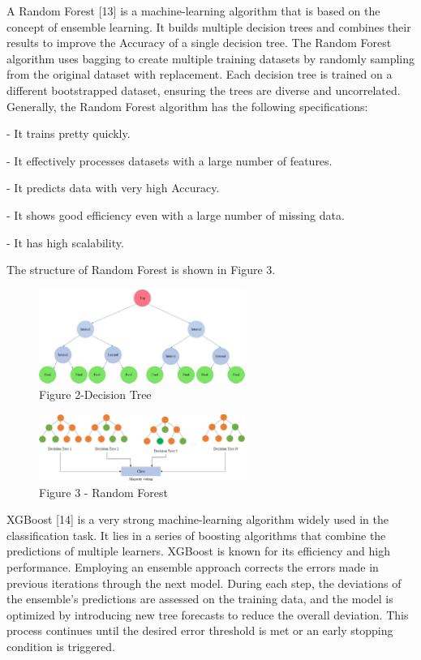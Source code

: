 A Random Forest {[}13{]} is a machine-learning algorithm that is based
on the concept of ensemble learning. It builds multiple decision trees
and combines their results to improve the Accuracy of a single decision
tree. The Random Forest algorithm uses bagging to create multiple
training datasets by randomly sampling from the original dataset with
replacement. Each decision tree is trained on a different bootstrapped
dataset, ensuring the trees are diverse and uncorrelated. Generally, the
Random Forest algorithm has the following specifications:

- It trains pretty quickly.

- It effectively processes datasets with a large number of features.

- It predicts data with very high Accuracy.

- It shows good efficiency even with a large number of missing data.

- It has high scalability.

The structure of Random Forest is shown in Figure 3.

\begin{figure}[H]
	\centering
	\includegraphics[width=0.6\textwidth]{media/ict/image39}
	\caption*{Figure 2-Decision Tree}
\end{figure}

\begin{figure}[H]
	\centering
	\includegraphics[width=0.6\textwidth]{media/ict/image40}
	\caption*{Figure 3 - Random Forest}
\end{figure}

XGBoost {[}14{]} is a very strong machine-learning algorithm widely used
in the classification task. It lies in a series of boosting algorithms
that combine the predictions of multiple learners. XGBoost is known for
its efficiency and high performance. Employing an ensemble approach
corrects the errors made in previous iterations through the next model.
During each step, the deviations of the ensemble's predictions are
assessed on the training data, and the model is optimized by introducing
new tree forecasts to reduce the overall deviation. This process
continues until the desired error threshold is met or an early stopping
condition is triggered.

